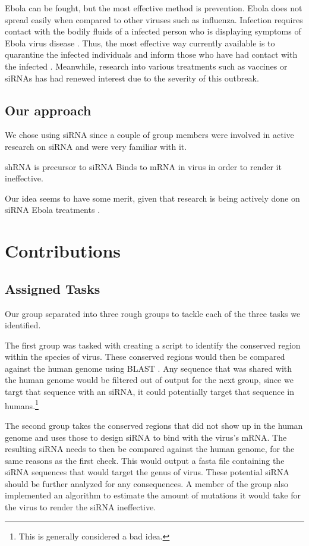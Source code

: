 \documentclass[10pt,letterpaper]{article}
\begin{document}
Ebola can be fought, but the most effective method is prevention.
Ebola does not spread easily when compared to other viruses such as influenza.
Infection requires contact with the bodily fluids of a infected person who is displaying symptoms of Ebola virus disease \cite{wongcharacterization} \cite{team2014ebola}.
Thus, the most effective way currently available is to quarantine the infected individuals and inform those who have had contact with the infected \cite{team2014ebola}.
Meanwhile, research into various treatments such as vaccines \cite{geisbert2015emergency} or siRNAs \cite{lipid} has had renewed interest due to the severity of this outbreak.


\subsection{Our approach}
We chose using siRNA since a couple of group members were involved in active research on siRNA and were very familiar with it.

shRNA is precursor to siRNA
Binds to mRNA in virus in order to render it ineffective.


Our idea seems to have some merit, given that research is being actively done on siRNA Ebola treatments \cite{lipid}.

\section{Contributions}




\subsection{Assigned Tasks}
Our group separated into three rough groups to tackle each of the three tasks we identified.

The first group was tasked with creating a script to identify the conserved region within the species of virus.
These conserved regions would then be compared against the human genome using BLAST \cite{blast}.
Any sequence that was shared with the human genome would be filtered out of output for the next group, since we targt that sequence with an siRNA, it could potentially target that sequence in humans.\footnote{This is generally considered a bad idea.}

The second group takes the conserved regions that did not show up in the human genome and uses those to design siRNA to bind with the virus's mRNA.
The resulting siRNA needs to then be compared against the human genome, for the same reasons as the first check.
This would output a fasta file containing the siRNA sequences that would target the genus of virus.
These potential siRNA should be further analyzed for any consequences.
A member of the group also implemented an algorithm to estimate the amount of mutations it would take for the virus to render the siRNA ineffective.
\end{document}
